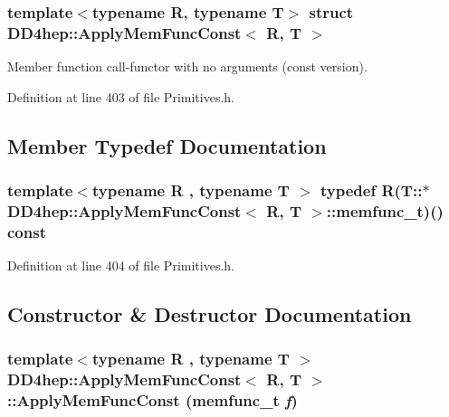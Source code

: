\subsubsection*{template$<$typename R, typename T$>$ struct DD4hep::ApplyMemFuncConst$<$ R, T $>$}

Member function call-\/functor with no arguments (const version). 

Definition at line 403 of file Primitives.h.

\subsection{Member Typedef Documentation}
\hypertarget{struct_d_d4hep_1_1_apply_mem_func_const_a542399152360e169bbbca81a4de7c69b}{
\subsubsection[{memfunc\_\-t}]{\setlength{\rightskip}{0pt plus 5cm}template$<$typename R , typename T $>$ typedef R(T::$\ast$ {\bf DD4hep::ApplyMemFuncConst}$<$ R, {\bf T} $>$::{\bf memfunc\_\-t})() const }}
\label{struct_d_d4hep_1_1_apply_mem_func_const_a542399152360e169bbbca81a4de7c69b}


Definition at line 404 of file Primitives.h.

\subsection{Constructor \& Destructor Documentation}
\hypertarget{struct_d_d4hep_1_1_apply_mem_func_const_a2ced0eb9c81ba9bb827054c2afc42961}{
\subsubsection[{ApplyMemFuncConst}]{\setlength{\rightskip}{0pt plus 5cm}template$<$typename R , typename T $>$ {\bf DD4hep::ApplyMemFuncConst}$<$ R, {\bf T} $>$::{\bf ApplyMemFuncConst} ({\bf memfunc\_\-t} {\em f})}}
\label{struct_d_d4hep_1_1_apply_mem_func_const_a2ced0eb9c81ba9bb827054c2afc42961}


